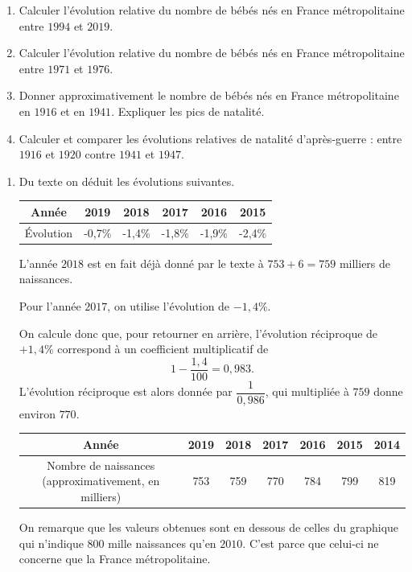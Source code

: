 \documentclass[a4paper, 14pt]{extarticle}
\theoremstyle{plain}
\theoremstyle{definition}
\begin{document}
{\begin{enumerate}
		\item Calculer l'évolution relative du nombre de bébés nés en France métropolitaine entre $1994$ et $2019$.
		
		\item Calculer l'évolution relative du nombre de bébés nés en France métropolitaine entre $1971$ et $1976$.
		
		\item Donner approximativement le nombre de bébés nés en France métropolitaine en $1916$ et en $1941$. Expliquer les pics de natalité.
		
		\item Calculer et comparer les évolutions relatives de natalité d'après-guerre : entre $1916$ et $1920$ contre $1941$ et $1947$.
	\end{enumerate}
}{

	\begin{enumerate}
		\item Du texte on déduit les évolutions suivantes.
		
		\begin{tabular}{|c|c|c|c|c|c|}\hline
			Année & 2019 & 2018 & 2017 & 2016 & 2015 \\ \hline
			Évolution & -0,7\% & -1,4\% & -1,8\% & -1,9\% & -2,4\% \\ \hline
		\end{tabular}
		
		L'année $2018$ est en fait déjà donné par le texte à $753+6 = 759$ milliers de naissances.
		
		Pour l'année $2017$, on utilise l'évolution de $-1,4\%$.
		
		On calcule donc que, pour retourner en arrière, l'évolution réciproque de $+1,4\%$ correspond à un coefficient multiplicatif de 
			\[ 1-\dfrac{1,4}{100} = 0,983. \]
		L'évolution réciproque est alors donnée par $\dfrac{1}{0,986}$, qui multipliée à $759$ donne environ $770$.
		
		\begin{tabular}{|c|c|c|c|c|c|c|}\hline
			Année & 2019 & 2018 & 2017 & 2016 & 2015 & 2014 \\ \hline
			\makecell{Nombre de  naissances \\ (approximativement, en milliers)} & 753 & 759 & 770 & 784 & 799 & 819 \\ \hline
		\end{tabular}
		
		On remarque que les valeurs obtenues sont en dessous de celles du graphique qui n'indique $800$ mille naissances qu'en $2010$.
		C'est parce que celui-ci ne concerne que la France métropolitaine.
		

\end{enumerate}}
\end{document}
